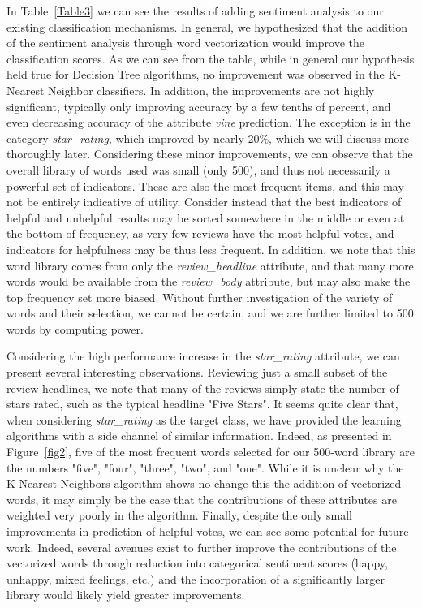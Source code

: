 \documentclass[10pt, conference, compsocconf]{IEEEtran}
\begin{document}
In Table~\ref{Table3} we can see the results of adding sentiment analysis to our existing classification mechanisms. In general, we hypothesized that the addition of the sentiment analysis through word vectorization would improve the classification scores. As we can see from the table, while in general our hypothesis held true for Decision Tree algorithms, no improvement was observed in the K-Nearest Neighbor classifiers. In addition, the improvements are not highly significant, typically only improving accuracy by a few tenths of percent, and even decreasing accuracy of the attribute \textit{vine} prediction. The exception is in the category \textit{star\_rating}, which improved by nearly 20\%, which we will discuss more thoroughly later. Considering these minor improvements, we can observe that the overall library of words used was small (only 500), and thus not necessarily a powerful set of indicators. These are also the most frequent items, and this may not be entirely indicative of utility. Consider instead that the best indicators of helpful and unhelpful results may be sorted somewhere in the middle or even at the bottom of frequency, as very few reviews have the most helpful votes, and indicators for helpfulness may be thus less frequent. In addition, we note that this word library comes from only the \textit{review\_headline} attribute, and that many more words would be available from the \textit{review\_body} attribute, but may also make the top frequency set more biased. Without further investigation of the variety of words and their selection, we cannot be certain, and we are further limited to 500 words by computing power. 

Considering the high performance increase in the \textit{star\_rating} attribute, we can present several interesting observations. Reviewing just a small subset of the review headlines, we note that many of the reviews simply state the number of stars rated, such as the typical headline "Five Stars". It seems quite clear that, when considering \textit{star\_rating} as the target class, we have provided the learning algorithms with a side channel of similar information. Indeed, as presented in Figure~\ref{fig2}, five of the most frequent words selected for our 500-word library are the numbers "five", "four", "three", "two", and "one". While it is unclear why the K-Nearest Neighbors algorithm shows no change this the addition of vectorized words, it may simply be the case that the contributions of these attributes are weighted very poorly in the algorithm. Finally, despite the only small improvements in prediction of helpful votes, we can see some potential for future work. Indeed, several avenues exist to further improve the contributions of the vectorized words through reduction into categorical sentiment scores (happy, unhappy, mixed feelings, etc.) and the incorporation of a significantly larger library would likely yield greater improvements.
\end{document}
